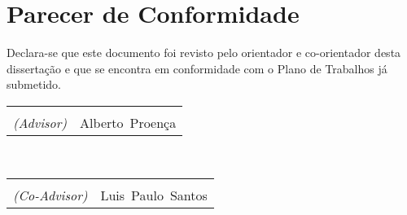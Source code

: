 \documentclass[a4paper,abstract=on,parskip=full]{scrreprt}
\makeatletter
\newcommand{\role}[1]{\textit{(#1)}}
\newcommand{\advisor}{\role{Advisor}}
\newcommand{\coadvisor}{\role{Co-Advisor}}
\newcommand{\sigspace}[2]{%
  \begin{minipage}{\columnwidth}%
  \vspace{2cm}%
  \begin{tabular*}{\textwidth}{@{\extracolsep{\fill}}lr}%
  \hline \\ [-10pt]%
  {#1} & #2%
  \end{tabular*}%
  \end{minipage}%
}
\makeatother
\begin{document}
\chapter*{Parecer de Conformidade}

Declara-se que este documento foi revisto pelo orientador e co-orientador desta dissertação e que se encontra em conformidade com o Plano de Trabalhos já submetido.

\setlength{\columnwidth}{10cm}
\sigspace{\advisor}{Alberto~Proença}\\
\sigspace{\coadvisor}{Luis~Paulo~Santos}

\thispagestyle{empty}
\end{document}
